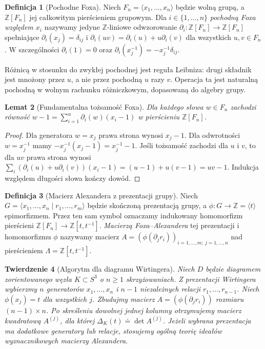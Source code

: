 \documentclass[11pt,a4paper]{report}
\numberwithin{equation}{section}
\theoremstyle{plain}
\newtheorem{twierdzenie}{Twierdzenie}[section]
\newtheorem{lemat}[twierdzenie]{Lemat}
\theoremstyle{definition}
\newtheorem{definicja}[twierdzenie]{Definicja}
\theoremstyle{remark}
\begin{document}
\begin{definicja}[Pochodne Foxa]
Niech $F_n=\langle x_1,\dots,x_n\rangle$ będzie wolną grupą,
a $\mathbb Z[F_n]$ jej całkowitym pierścieniem grupowym.
Dla $i\in\{1,\dots,n\}$ \emph{pochodną Foxa względem $x_i$}
nazywamy jedyne $\mathbb Z$-liniowe odwzorowanie
$\partial_i\colon\mathbb Z[F_n]\to\mathbb Z[F_n]$
spełniające $\partial_i(x_j)=\delta_{ij}$ i
$\partial_i(uv)=\partial_i(u)+u\partial_i(v)$
dla wszystkich $u,v\in F_n$. W szczególności
$\partial_i(1)=0$ oraz
$\partial_i(x_j^{-1})=-x_j^{-1}\delta_{ij}$.
\end{definicja}

Różnicą w stosunku do zwykłej pochodnej jest reguła
Leibniza: drugi składnik jest mnożony przez $u$, a nie
przez pochodną $u$ razy $v$. Operacja ta jest naturalną
pochodną w wolnym rachunku różniczkowym, dopasowaną
do algebry grupy.

\begin{lemat}[Fundamentalna tożsamość Foxa]
Dla każdego słowa $w\in F_n$ zachodzi równość
$w-1=\sum_{i=1}^n\partial_i(w)(x_i-1)$
w pierścieniu $\mathbb Z[F_n]$.
\end{lemat}

\begin{proof}
Dla generatora $w=x_j$ prawa strona wynosi $x_j-1$.
Dla odwrotności $w=x_j^{-1}$ mamy
$-x_j^{-1}(x_j-1)=x_j^{-1}-1$. Jeśli tożsamość
zachodzi dla $u$ i $v$, to dla $uv$ prawa strona wynosi
$\sum_i(\partial_i(u)+u\partial_i(v))(x_i-1)
=(u-1)+u(v-1)=uv-1$.
Indukcja względem długości słowa kończy dowód.
\end{proof}

\begin{definicja}[Macierz Alexandera z prezentacji grupy]
Niech $G=\langle x_1,\dots,x_n\mid r_1,\dots,r_m\rangle$
będzie skończoną prezentacją grupy, a
$\phi\colon G\to\mathbb Z=\langle t\rangle$ epimorfizmem.
Przez ten sam symbol oznaczamy indukowany homomorfizm
pierścieni $\mathbb Z[F_n]\to\mathbb Z[t,t^{-1}]$.
\emph{Macierzą Foxa--Alexandera} tej prezentacji i
homomorfizmu $\phi$ nazywamy macierz
$A=(\phi(\partial_jr_i))_{i=1,\dots,m;\ j=1,\dots,n}$
nad pierścieniem $\Lambda=\mathbb Z[t,t^{-1}]$.
\end{definicja}

\begin{twierdzenie}[Algorytm dla diagramu Wirtingera]
Niech $D$ będzie diagramem zorientowanego węzła
$K\subset S^3$ o $n\geq1$ skrzyżowaniach.
Z prezentacji Wirtingera wybierzmy $n$ generatorów
$x_1,\dots,x_n$ i $n-1$ niezależnych relacji
$r_1,\dots,r_{n-1}$. Niech
$\phi(x_j)=t$ dla wszystkich $j$. Zbudujmy macierz
$A=(\phi(\partial_jr_i))$ rozmiaru $(n-1)\times n$.
Po skreśleniu dowolnej jednej kolumny otrzymujemy
macierz kwadratową $A^{(j)}$, dla której
$\Delta_K(t)\doteq\det A^{(j)}$.
Jeżeli wybrana prezentacja ma dodatkowe generatory
lub relacje, stosujemy ogólną teorię ideałów
wyznacznikowych macierzy Alexandera.
\end{twierdzenie}
\end{document}
